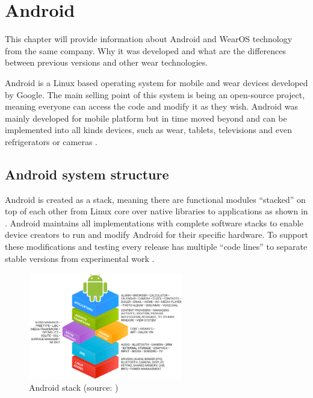 \chapter{Android}\label{sec:Android}
This chapter will provide information about Android and WearOS technology from the same company. Why it was developed and what are the differences between previous versions and other wear technologies.

\medskip

Android is a Linux based operating system for mobile and wear devices developed by Google. The main selling point of this system is being an open-source project, meaning everyone can access the code and modify it as they wish. Android was mainly developed for mobile platform but in time moved beyond and can be implemented into all kinds devices, such as wear, tablets, televisions and even refrigerators or cameras \cite{WIGA}.

\section{Android system structure}\label{sec:AndroidSystemStructure}
Android is created as a stack, meaning there are functional modules \enquote{stacked} on top of each other from Linux core over native libraries to applications as shown in . Android maintains all implementations with complete software stacks to enable device creators to run and modify Android for their specific hardware. To support these modifications and testing every release has multiple \enquote{code lines} to separate stable versions from experimental work \cite{AOSP}.

\begin{figure}[H]
	\begin{centering}
		\includegraphics[width=0.6\textwidth]{img/android_stack}
		\par\end{centering}
	\caption{Android stack (source: \cite{AOSP})\label{fig:AndroidStack}}
	\label{fig01c04}
\end{figure}

